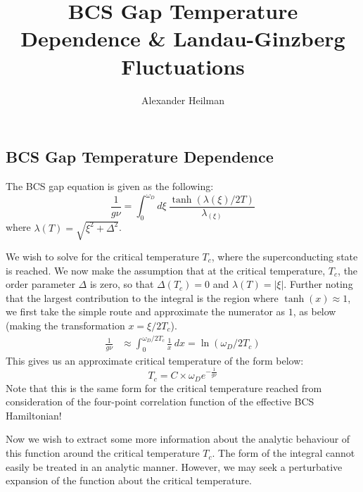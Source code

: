 \documentclass[10pt,a4paper]{article}
\title{BCS Gap Temperature Dependence \& Landau-Ginzberg Fluctuations}
\author{Alexander Heilman}
\begin{document}
\vspace{-3cm}
 
\maketitle

\begin{multicols}{2}
\section{BCS Gap Temperature Dependence}
The BCS gap equation is given as the following:
$$
\frac{1}{g\nu}=\int_0^{\omega_D}d\xi\ \frac{\tanh(\lambda(\xi)/2T)}{\lambda_(\xi)}
$$
where $\lambda(T)=\sqrt{\xi^2+\Delta^2}$. 

We wish to solve for the critical temperature $T_c$, where the superconducting state is reached. We now make the assumption that at the critical temperature, $T_c$, the order parameter $\Delta$ is zero, so that $\Delta(T_c)=0$ and $\lambda(T)=|\xi |$. Further noting that the largest contribution to the integral is the region where $\tanh(x)\approx 1$, we first take the simple route and approximate the numerator as $1$, as below (making the transformation $x=\xi/2T_c$).
\begin{align*}
\frac{1}{g\nu}&\approx \int_0^{\omega_D /2T_c} \frac{1}{x}\ dx
 = \ln(\omega_D/2T_c)
\end{align*}
This gives us an approximate critical temperature of the form below:
$$
T_c = C \times \omega_D e^{-\frac{1}{g\nu}}
$$
Note that this is the same form for the critical temperature reached from consideration of the four-point correlation function of the effective BCS Hamiltonian!

Now we wish to extract some more information about the analytic behaviour of this function around the critical temperature $T_c$. The form of the integral cannot easily be treated in an analytic manner. However, we may seek a perturbative expansion of the function about the critical temperature.


\end{multicols}
\end{document}
